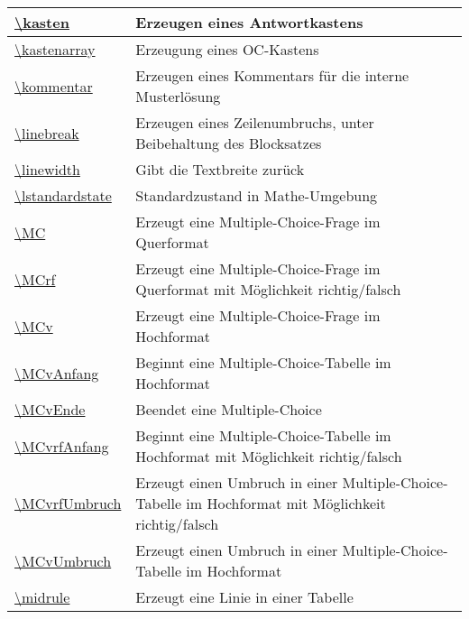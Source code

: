 \documentclass[./main.tex]{subfiles}
\begin{document}
\begin{tabularx}{\linewidth}{|l|X|}
    \hyperlink{kasten}{\textbackslash{}kasten}&Erzeugen eines Antwortkastens\\\hline
    \hyperlink{kastenarray}{\textbackslash{}kastenarray}&Erzeugung eines OC-Kastens\\\hline
    \hyperlink{kommentar}{\textbackslash{}kommentar}&Erzeugen eines Kommentars f\"ur die interne Musterl\"osung\\\hline
    \hyperlink{linebreak}{\textbackslash{}linebreak}&Erzeugen eines Zeilenumbruchs, unter Beibehaltung des Blocksatzes\\\hline
    \hyperlink{linewidth}{\textbackslash{}linewidth}&Gibt die Textbreite zur\"uck\\\hline
    \hyperlink{lstandardstate}{\textbackslash{}lstandardstate}&Standardzustand in Mathe-Umgebung\\\hline
    \hyperlink{MC}{\textbackslash{}MC}&Erzeugt eine Multiple-Choice-Frage im Querformat\\\hline
    \hyperlink{MCrf}{\textbackslash{}MCrf}&Erzeugt eine Multiple-Choice-Frage im Querformat mit M\"oglichkeit richtig/falsch\\\hline
    \hyperlink{MCv}{\textbackslash{}MCv}&Erzeugt eine Multiple-Choice-Frage im Hochformat\\\hline
    \hyperlink{MCvAnfang}{\textbackslash{}MCvAnfang}&Beginnt eine Multiple-Choice-Tabelle im Hochformat\\\hline
    \hyperlink{MCvEnde}{\textbackslash{}MCvEnde}&Beendet eine Multiple-Choice\\\hline
    \hyperlink{MCvrfAnfang}{\textbackslash{}MCvrfAnfang}&Beginnt eine Multiple-Choice-Tabelle im Hochformat mit M\"oglichkeit richtig/falsch\\\hline
    \hyperlink{MCvrfUmbruch}{\textbackslash{}MCvrfUmbruch}&Erzeugt einen Umbruch in einer Multiple-Choice-Tabelle im Hochformat mit M\"oglichkeit richtig/falsch\\\hline
    \hyperlink{MCvUmbruch}{\textbackslash{}MCvUmbruch}&Erzeugt einen Umbruch in einer Multiple-Choice-Tabelle im Hochformat\\\hline
    \hyperlink{midrule}{\textbackslash{}midrule}&Erzeugt eine Linie in einer Tabelle\\\hline

\end{tabularx}
\end{document}
